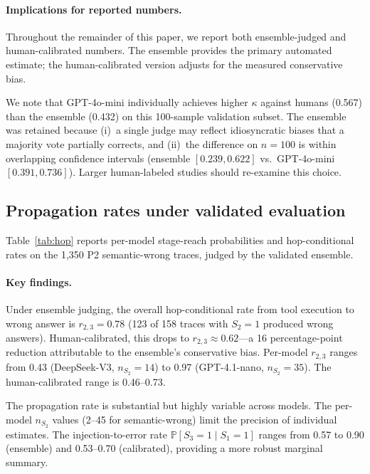 \documentclass{article}
\renewcommand{\Pr}{\mathbb{P}}
\begin{document}
\paragraph{Implications for reported numbers.}
Throughout the remainder of this paper, we report both ensemble-judged
and human-calibrated numbers.
The ensemble provides the primary automated estimate; the
human-calibrated version adjusts for the measured conservative bias.

We note that GPT-4o-mini individually achieves higher $\kappa$ against
humans (0.567) than the ensemble (0.432) on this 100-sample validation
subset.
The ensemble was retained because (i)~a single judge may reflect
idiosyncratic biases that a majority vote partially corrects, and
(ii)~the difference on $n{=}100$ is within overlapping confidence
intervals (ensemble $[0.239, 0.622]$ vs.\ GPT-4o-mini
$[0.391, 0.736]$).
Larger human-labeled studies should re-examine this choice.

\subsection{Propagation rates under validated evaluation}
\label{sec:propagation}

Table~\ref{tab:hop} reports per-model stage-reach probabilities and
hop-conditional rates on the 1{,}350 P2 semantic-wrong traces, judged
by the validated ensemble.



\paragraph{Key findings.}
Under ensemble judging, the overall hop-conditional rate from tool
execution to wrong answer is $r_{2,3} = 0.78$ (123 of 158 traces with
$S_2{=}1$ produced wrong answers).
Human-calibrated, this drops to $r_{2,3} \approx 0.62$---a 16
percentage-point reduction attributable to the ensemble's conservative
bias.
Per-model $r_{2,3}$ ranges from 0.43 (DeepSeek-V3, $n_{S_2}{=}14$)
to 0.97 (GPT-4.1-nano, $n_{S_2}{=}35$).
The human-calibrated range is 0.46--0.73.

The propagation rate is substantial but highly variable across models.
The per-model $n_{S_2}$ values (2--45 for semantic-wrong) limit the
precision of individual estimates.
The injection-to-error rate $\Pr[S_3{=}1 \mid S_1{=}1]$ ranges from
0.57 to 0.90 (ensemble) and 0.53--0.70 (calibrated), providing a more
robust marginal summary.
\end{document}
